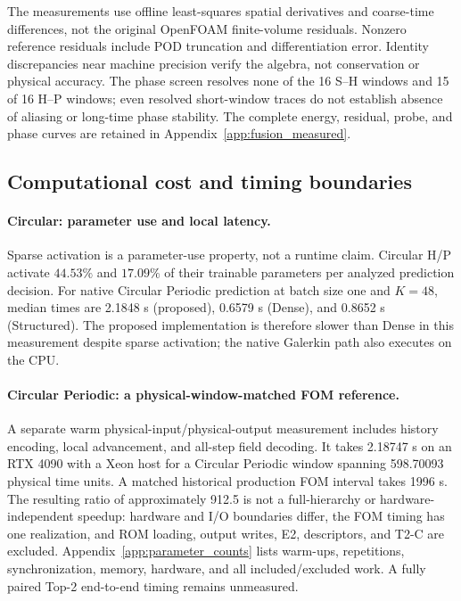 The measurements use offline least-squares spatial derivatives
and coarse-time differences, not the original OpenFOAM
finite-volume residuals. Nonzero reference residuals include POD
truncation and differentiation error.
Identity discrepancies near machine precision verify the algebra,
not conservation or physical accuracy.
The phase screen resolves none of the 16 S--H windows and 15 of
16 H--P windows; even resolved short-window traces do not establish
absence of aliasing or long-time phase stability.
The complete energy, residual, probe, and phase curves are retained
in Appendix~\ref{app:fusion_measured}.

\subsection{Computational cost and timing boundaries}
\label{sec:exp_cost}

\paragraph{Circular: parameter use and local latency.}
Sparse activation is a parameter-use property, not a runtime claim.
Circular H/P activate $44.53\%$ and $17.09\%$ of their trainable
parameters per analyzed prediction decision.
For native Circular Periodic prediction at batch size one and
$K=48$, median times are 2.1848 s (proposed), 0.6579 s (Dense),
and 0.8652 s (Structured).
The proposed implementation is therefore slower than Dense in this
measurement despite sparse activation; the native Galerkin path
also executes on the CPU.

\paragraph{Circular Periodic: a physical-window-matched FOM reference.}
A separate warm physical-input/physical-output measurement includes
history encoding, local advancement, and all-step field decoding.
It takes 2.18747 s on an RTX 4090 with a Xeon host for a Circular
Periodic window spanning 598.70093 physical time units.
A matched historical production FOM interval takes 1996 s.
The resulting ratio of approximately 912.5 is not a full-hierarchy
or hardware-independent speedup: hardware and I/O boundaries differ,
the FOM timing has one realization, and ROM loading, output writes,
E2, descriptors, and T2-C are excluded.
Appendix~\ref{app:parameter_counts} lists warm-ups, repetitions,
synchronization, memory, hardware, and all included/excluded work.
A fully paired Top-2 end-to-end timing remains unmeasured.
